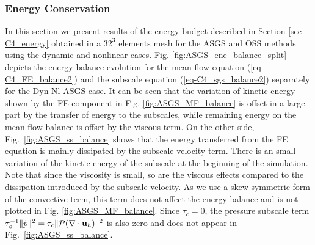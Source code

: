 \subsubsection{Energy Conservation}
\label{subsubsec-C4_ene_cons_DHIT}

In this section we present results of the energy budget described in Section \ref{sec-C4_energy} obtained in a $32^3$ elements mesh for the ASGS and OSS methods using the dynamic and nonlinear cases.
Fig. \ref{fig:ASGS_ene_balance_split} depicts the energy balance evolution for the mean flow equation (\ref{eq-C4_FE_balance2}) and the subscale equation (\ref{eq-C4_sgs_balance2}) separately for the Dyn-Nl-ASGS case. It can be seen that the variation of kinetic energy shown by the FE component in Fig. \ref{fig:ASGS_MF_balance} is offset in a large part by the transfer of energy to the subscales, while remaining energy on the mean flow balance is offset by the viscous term. On the other side, Fig.~\ref{fig:ASGS_ss_balance} shows that the energy transferred from the FE equation is mainly dissipated by the subscale velocity term. There is an small variation of the kinetic energy of the subscale at the beginning of the simulation. Note that since the viscosity is small, so are the viscous effects compared to the dissipation introduced by the subscale velocity. As we use a skew-symmetric form of the convective term, this term does not affect the energy balance and is not plotted in Fig. \ref{fig:ASGS_MF_balance}. Since $\tau_c=0$, the pressure subscale term $\tau_c^{-1}\|\tilde{p}\|^2
= \tau_c \Vert {\cal P}(\nabla\cdot{\bf u}_h)\Vert^2$ is also zero and does not appear in Fig.~\ref{fig:ASGS_ss_balance}.


